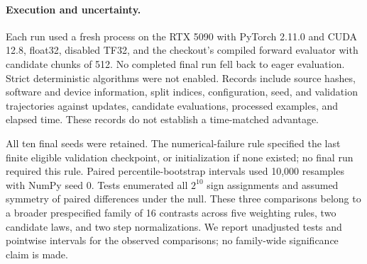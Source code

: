 \paragraph{Execution and uncertainty.}
Each run used a fresh process on the RTX 5090 with PyTorch 2.11.0 and CUDA 12.8,
float32, disabled TF32,
and the checkout's compiled forward evaluator with candidate chunks of 512.
No completed final run fell back to eager evaluation. Strict deterministic
algorithms were not enabled. Records include source hashes, software and
device information, split indices, configuration, seed, and validation
trajectories against updates, candidate evaluations, processed examples,
and elapsed time. These records do not establish a time-matched advantage.

All ten final seeds were retained. The numerical-failure rule specified the
last finite eligible validation checkpoint, or initialization if none existed;
no final run required this rule. Paired percentile-bootstrap
intervals used 10,000 resamples with NumPy seed 0. Tests enumerated all
$2^{10}$ sign assignments and assumed symmetry of paired differences under
the null. These three comparisons belong to a broader prespecified family
of 16 contrasts across five weighting rules, two candidate laws, and two
step normalizations. We report unadjusted tests and pointwise intervals
for the observed comparisons; no family-wide significance claim is made.
